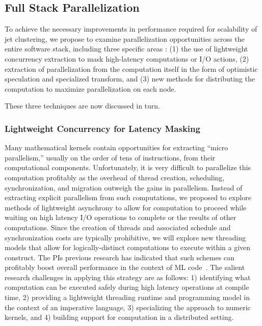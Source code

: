 \documentclass[12pt]{article}
\begin{document}
\subsection{Full Stack Parallelization}

To achieve the necessary improvements in performance required for scalability
of jet clustering, we propose to examine parallelization opportunities across
the entire software stack, including three specific areas : 
(1) the use of lightweight concurrency
extraction to mask high-latency computations or I/O actions, 
(2) extraction of
parallelization from the computation itself in the form of optimistic speculation
and specialized transform, and
(3) new methods for distributing the computation to
maximize parallelization on each node. 

These three techniques are now discussed in turn. 

\subsubsection{Lightweight Concurrency for Latency Masking}

Many mathematical kernels contain opportunities for extracting ``micro parallelism,''
usually on the order of tens of instructions, from their computational components. 
Unfortunately, it is very difficult to parallelize this computation profitably as
the overhead of thread creation, scheduling, synchronization, and migration outweigh
the gains in parallelism. Instead of extracting explicit parallelism from such
computations, we proposed to explore methods of lightweight asynchrony to allow for
computation to proceed while waiting on high latency I/O operations to complete or
the results of other computations. Since the creation of threads and associated
schedule and synchronization costs are typically prohibitive, we will explore new
threading models that allow for logically-distinct computations to execute within
a given construct. The PIs previous research has indicated that such schemes can profitably
boost overall performance in the context of ML code~\cite{acml, parasites}. The salient research
challenges in applying this strategy are as follows:  1) identifying what computation can be executed
safely during high latency operations at compile time, 2) providing a lightweight threading runtime
and programming model in the context of an imperative language, 
3) specializing the approach to numeric kernels,
and 4) building support for computation in a distributed setting.
\end{document}
